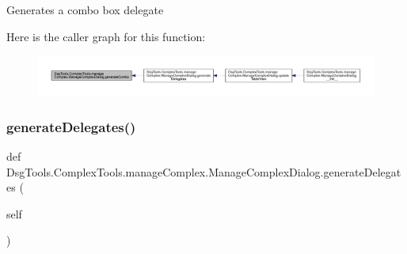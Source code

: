 \begin{DoxyVerb}Generates a combo box delegate
\end{DoxyVerb}
 Here is the caller graph for this function\+:
\nopagebreak
\begin{figure}[H]
\begin{center}
\leavevmode
\includegraphics[width=350pt]{class_dsg_tools_1_1_complex_tools_1_1manage_complex_1_1_manage_complex_dialog_aac3390863edf9ad88887aa65e640c445_icgraph}
\end{center}
\end{figure}
\mbox{\label{class_dsg_tools_1_1_complex_tools_1_1manage_complex_1_1_manage_complex_dialog_ad00be17c75aa87dc7a60d00ffec6f2df}} 
\subsubsection{\texorpdfstring{generate\+Delegates()}{generateDelegates()}}
{\footnotesize\ttfamily def Dsg\+Tools.\+Complex\+Tools.\+manage\+Complex.\+Manage\+Complex\+Dialog.\+generate\+Delegates (\begin{DoxyParamCaption}\item[{}]{self }\end{DoxyParamCaption})}


